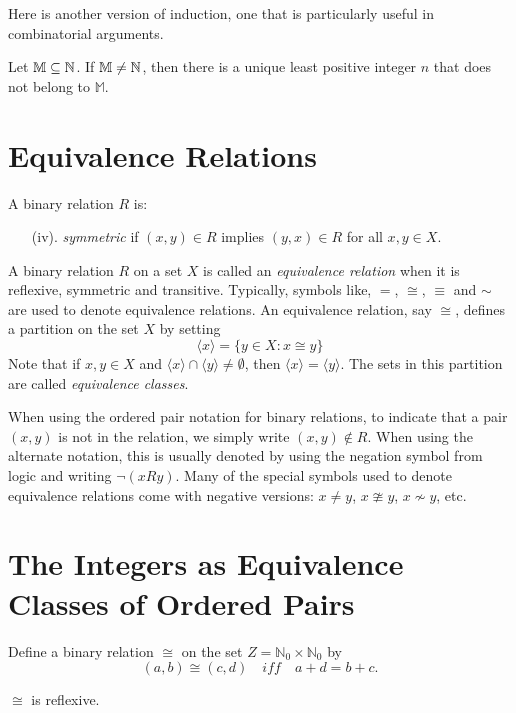 Here is another version of induction, one that is particularly useful
in combinatorial arguments.

\begin{theorem}
Let $\mathbb{M}\subseteq\mathbb{N}$.  If $\mathbb{M}\neq\mathbb{N}$,
then there is a unique least positive integer $n$ that does not
belong to $\mathbb{M}$.
\end{theorem}

\section{Equivalence Relations}\label{s:background:equivalence}

A binary relation $R$ is:

\begin{enumerate}
\item[(iv).] \textit{symmetric} if $(x,y)\in R$ implies $(y,x)\in R$ for
all $x,y\in X$.
\end{enumerate}

A binary relation $R$ on a set $X$ is called an
\textit{equivalence relation} when it is reflexive, symmetric
and transitive.  Typically, symbols like, $=$, $\cong$,
$\equiv$ and $\sim$ are used to
denote equivalence relations.  An equivalence relation, say
$\cong$, defines
a partition on the set $X$ by setting
\[
\langle x\rangle =\{y\in X: x\cong y\}
\]
Note that if $x,y\in X$ and $\langle x\rangle\cap\langle y\rangle
\neq\emptyset$, then $\langle x\rangle=\langle y\rangle$.
The sets in this partition are called \textit{equivalence classes}.

When using the ordered pair notation for binary relations,
to indicate that a pair $(x,y)$ is not in the relation,
we simply write $(x,y)\notin R$. When using the alternate
notation, this is usually denoted by using the negation
symbol from logic and writing $\lnot (xRy)$.  Many of the
special symbols used to denote equivalence relations
come with negative versions: $x\neq y$, $x\ncong y$,
$x\nsim y$, etc.

\section{The Integers as Equivalence Classes of Ordered Pairs}\label{s:background:integers}

Define a binary relation $\cong$ on the set $Z=\mathbb{N}_0
 \times\mathbb{N}_0$ by
\[
(a,b)\cong (c,d)\quad\textit{iff}\quad a+d=b+c.
\]

\begin{lemma}
$\cong$ is reflexive.
\end{lemma}

